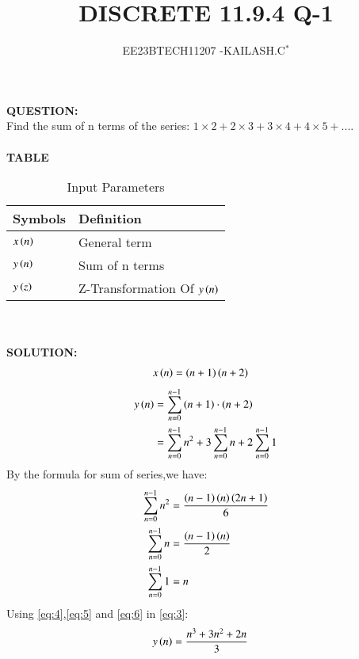 \documentclass[journal,12pt,twocolumn]{IEEEtran}
\theoremstyle{remark}
\begin{document}

\vspace{3cm}

\title{DISCRETE 11.9.4 Q-1}
\author{EE23BTECH11207 -KAILASH.C$^{*}$%
}
\maketitle
\newpage
\bigskip

\renewcommand{\thefigure}{\theenumi}
\renewcommand{\thetable}{\theenumi}


\textbf{QUESTION:}\\
Find the sum of n terms of the series:
$1\times2+2\times3+3\times4+4\times5+....$\\ \\
\textbf{TABLE}\\
\begin{table}[h]
\begin{tabular}{|l|l|}
\hline
\textbf{Symbols} & \textbf{Definition}\\ \hline
$x\left(n\right)$ & General term \\ \hline
$y\left(n\right)$ & Sum of n terms \\ \hline
$y\left(z\right)$ & Z-Transformation Of $y\left(n\right)$\\ \hline
\end{tabular}
\caption{Input Parameters}
\label{Fig:1}
\end{table}\\ \\
\textbf{SOLUTION:}\\
\begin{align}
 x\left(n\right)&=\left(n+1\right)\left(n+2\right)   \label{eq:1}
\end{align}
\begin{align}
y\left(n\right)&=\sum_{n=0}^{n-1} \left(n+1\right) \cdot \left(n+2\right)\label{eq:2}\\
     &=\sum_{n=0}^{n-1} n^2+3\sum_{n=0}^{n-1} n+2 \sum_{n=0}^{n-1} 1\label{eq:3}
\end{align}
By the formula for sum of series,we have:
\begin{align}
    \sum_{n=0}^{n-1} n^2&=\frac{\left(n-1\right)\left(n\right)\left(2n+1\right)}{6}\label{eq:4} \\
    \sum_{n=0}^{n-1} n&=\frac{\left(n-1\right)\left(n\right)}{2} \label{eq:5} \\
    \sum_{n=0}^{n-1} 1&=n \label{eq:6}
\end{align}
Using \eqref{eq:4},\eqref{eq:5} and \eqref{eq:6} in \eqref{eq:3}:
\begin{align}
    y\left(n\right)&=\frac{n^3+3n^2+2n}{3}\label{eq:7}
\end{align}\\
\end{document}
